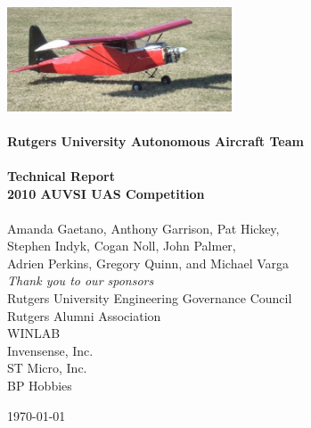 \begin{titlepage}
\begin{center}

\includegraphics[width=0.5\textwidth]{../images/daedalus.jpg}\\[1cm]
\HRule \\[1cm]
{ \huge \bfseries Rutgers University Autonomous Aircraft Team } \\[0.5cm]
\HRule \\[0.5cm]
{ \large \bfseries Technical Report }
\\[0.5cm]
{ \large \bfseries 2010 AUVSI UAS Competition }
\\[0.5cm]
\HRule \\[1cm]

  {\large Amanda Gaetano, Anthony Garrison, Pat Hickey,}
\\{\large Stephen Indyk, Cogan Noll, John Palmer,}
\\{\large Adrien Perkins, Gregory Quinn, and Michael Varga}
\\[1cm]
\emph{Thank you to our sponsors}
\\ Rutgers University Engineering Governance Council
\\ Rutgers Alumni Association
\\ WINLAB
\\ Invensense, Inc.
\\ ST Micro, Inc.
\\ BP Hobbies

\vfill
{\large \today}

\end{center}
\end{titlepage}
